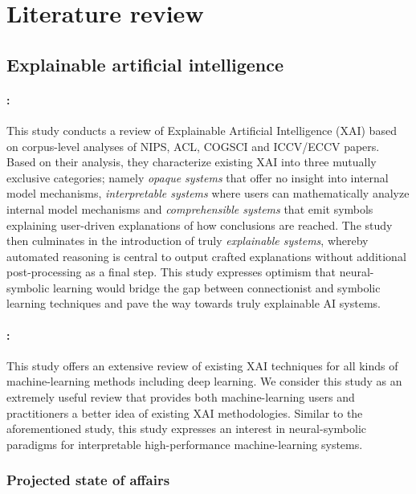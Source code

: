 \section{Literature review}

\subsection{Explainable artificial intelligence}

\paragraph{\citealt{doran2017does}:} This study conducts a review of Explainable Artificial Intelligence (XAI) based on corpus-level analyses of NIPS, ACL, COGSCI and ICCV/ECCV papers. Based on their analysis, they characterize existing XAI into three mutually exclusive categories; namely \textit{opaque systems} that offer no insight into internal model mechanisms, \textit{interpretable systems} where users can mathematically analyze internal model mechanisms and \textit{comprehensible systems} that emit symbols explaining user-driven explanations of how conclusions are reached. The study then culminates in the introduction of truly \textit{explainable systems}, whereby automated reasoning is central to output crafted explanations without additional post-processing as a final step. This study expresses optimism that neural-symbolic learning would bridge the gap between connectionist and symbolic learning techniques and pave the way towards truly explainable AI systems.

\paragraph{\citealt{arrieta2020explainable}:} This study offers an extensive review of existing XAI techniques for all kinds of machine-learning methods including deep learning. We consider this study as an extremely useful review that provides both machine-learning users and practitioners a better idea of existing XAI methodologies. Similar to the aforementioned study, this study expresses an interest in neural-symbolic paradigms for interpretable high-performance machine-learning systems.

\subsubsection{Projected state of affairs}

